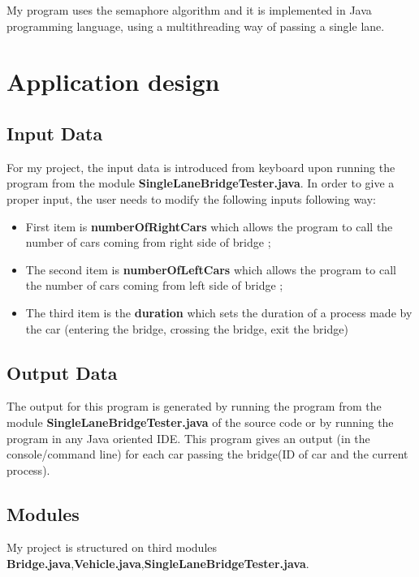 \documentclass{article}
\begin{document}
My program uses the semaphore algorithm and it is implemented in Java programming language, using a multithreading way of passing a single lane.
\pagebreak




\section{Application design}
\subsection{Input Data}
For my project, the input data is introduced from keyboard upon running the program from the module {\bf SingleLaneBridgeTester.java}. In order to give a proper input, the user needs to modify the following inputs following way: \\
\begin{itemize}

\item First item is {\bf numberOfRightCars} which allows the program to call the number of cars coming from right side of bridge ;\\
\item The second item is {\bf numberOfLeftCars} which allows the program to call the number of cars coming from left side of bridge ;\\
\item The third item is the {\bf duration} which sets the duration of a process made by the car (entering the bridge, crossing the bridge, exit the bridge)\\

\end{itemize}
\subsection {Output Data}
The output for this program is generated by running the program from the module {\bf SingleLaneBridgeTester.java} of the source code or by running the program in any Java oriented IDE. This program gives an output (in the console/command line) for each car passing the bridge(ID of car and the current process). 
\subsection{Modules}
 My project is structured on third modules {\bf Bridge.java},{\bf Vehicle.java},{\bf SingleLaneBridgeTester.java}.  \\
\end{document}
